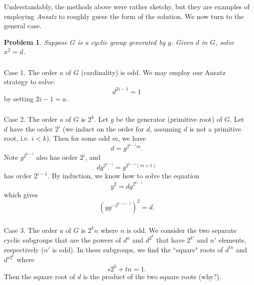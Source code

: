 \documentclass{article}
\newtheorem*{problem}{Problem}
\begin{document}
\subsubsection{}
Understandably, the methods above were rather sketchy, but they are examples of employing \textit{Ansatz} to roughly guess the form of the solution. We now turn to the general case.
\begin{problem}
Suppose $G$ is a cyclic group generated by $g$. Given $d$ in $G$, solve $x^{2} = d$.
\end{problem}

\subsubsection{}
Case 1. The order $a$ of $G$ (cardinality) is odd. We may employ our Ansatz strategy to solve:
\begin{equation}
    d^{2i-1} = 1
\end{equation}
by setting $2i-1 = a$.

\subsubsection{}
Case 2. The order $a$ of $G$ is $2^{k}$. Let $g$ be the generator (primitive root) of $G$. Let $d$ have the order $2^{i}$ (we induct on the order for $d$, assuming $d$ is not a primitive root, i.e. $i < k$). Then for some odd $m$, we have
\begin{equation}
    d = g^{2^{k-i}m}.
\end{equation}
Note $g^{2^{k-i}}$ also has order $2^{i}$, and
\begin{equation}
    dg^{2^{k-i}} = g^{2^{k-i}(m+1)}
\end{equation}
has order $2^{i-1}$. By induction, we know how to solve the equation
\begin{equation}
    y^{2} = dg^{2^{k-i}}
\end{equation}
which gives
\begin{equation}
    (yg^{-2^{k-i-1}})^{2} = d.
\end{equation}
\subsubsection{}
Case 3. The order $a$ of $G$ is $2^{k}n$ where $n$ is odd. We consider the two separate cyclic subgroups that are the powers of $d^{n}$ and $d^{2^{k}}$ that have $2^{k'}$ and $n'$ elements, respectively ($n'$ is odd). In these subgroups, we find the ``square" roots of $d^{tn}$ and $d^{s2^{k}}$ where
\begin{equation}
    s2^{k} + tn = 1.
\end{equation}
Then the square root of $d$ is the product of the two square roots (why?).
\end{document}
